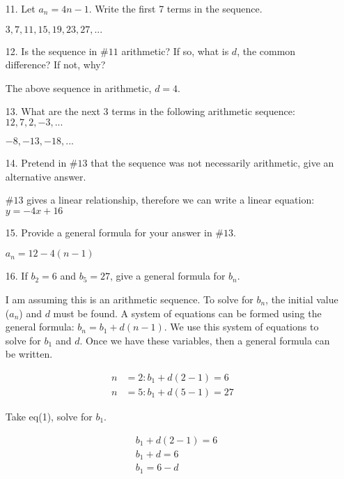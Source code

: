 \documentclass{article}
\begin{document}
\begin{itemize}
    \item[11.] Let $a_n=4n-1$. Write the first 7 terms in the sequence. 
    
    {\color{blue} $3,7,11,15,19,23,27,...$}
    
    \item[12.] Is the sequence in $\#11$ arithmetic?  If so, what is $d$, the common difference?  If not, why? 
    
    {\color{blue} The above sequence in arithmetic, $d=4$.}
    
    \item[13.] What are the next 3 terms in the following arithmetic sequence: $12, 7, 2, -3, ...$
    
    {\color{blue} $-8,-13,-18,...$}
    
    \item[14.] Pretend in $\#13$ that the sequence was not necessarily arithmetic, give an alternative answer.
    
    {\color{blue} $\#13$ gives a linear relationship, therefore we can write a linear equation: $y=-4x+16$}
    
    \item[15.] Provide a general formula for your answer in $\#13$.
    
    {\color{blue} $a_n=12-4(n-1)$}
    
    \item[16.] If $b_2=6$ and  $b_5=27$, give a general formula for $b_n$.
    
    {\color{blue} I am assuming this is an arithmetic sequence.  To solve for $b_n$, the initial value ($a_n$) and $d$ must be found.  A system of equations can be formed using the general formula: $b_n=b_1+d(n-1)$. We use this system of equations to solve for $b_1$ and $d$.  Once we have these variables, then a general formula can be written.}
    
    \begin{align}
        n&=2: b_1+d(2-1)=6\\
        n&=5: b_1+d(5-1)=27
    \end{align}
    
    Take eq(1), solve for $b_1$.
    
    \begin{align}
        &b_1+d(2-1)=6\nonumber\\
        &b_1+d=6\nonumber\\
        &b_1=6-d
    \end{align}
    

\end{itemize}
\end{document}

